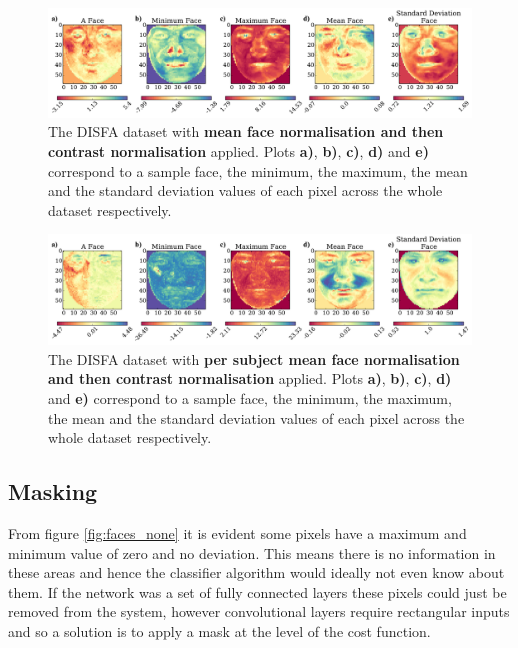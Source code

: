       \begin{figure}[!h] \centering
      \includegraphics[width =\hsize]{figures/faces_contrast_face.pdf}
      \caption{The DISFA dataset with {\bf mean face normalisation and then contrast normalisation} applied.
      Plots {\bf a)}, {\bf b)}, {\bf c)}, {\bf d)} and {\bf e)}
      correspond to a sample face, the minimum, the maximum,
      the mean and the standard deviation values of each pixel across
      the whole dataset respectively.}
      \label{fig:faces_contrast_face} \end{figure}

      \begin{figure}[!h] \centering
      \includegraphics[width =\hsize]{figures/faces_per_subject_contrast_face.pdf}
      \caption{The DISFA dataset with {\bf per subject mean face normalisation and then contrast normalisation} applied.
      Plots {\bf a)}, {\bf b)}, {\bf c)}, {\bf d)} and {\bf e)}
      correspond to a sample face, the minimum, the maximum,
      the mean and the standard deviation values of each pixel across
      the whole dataset respectively.}
      \label{fig:faces_per_subject_contrast_face} \end{figure}

    \subsection{Masking} \label{sec:mask}
      From figure \ref{fig:faces_none} it is evident some pixels have a maximum and minimum value
      of zero and no deviation. This means there is no information in these areas and hence
      the classifier algorithm would ideally not even know about them. If the network was a set of fully connected layers
      these pixels could just be removed from the system, however convolutional layers require
      rectangular inputs and so a solution is to apply a mask at the level of the cost function.


